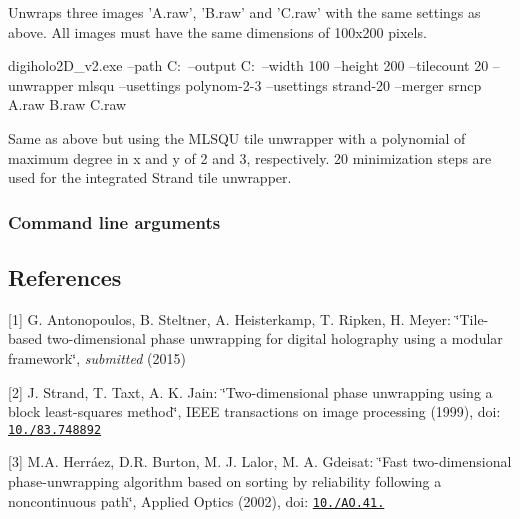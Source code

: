 Unwraps three images 'A.\-raw', 'B.\-raw' and 'C.\-raw' with the same settings as above. All images must have the same dimensions of 100x200 pixels. \begin{DoxyVerb}digiholo2D_v2.exe --path C:\ --output C:\outputfolder\ --width 100 --height 200 --tilecount 20 --unwrapper mlsqu --usettings polynom-2-3 --usettings strand-20 --merger srncp A.raw B.raw C.raw
\end{DoxyVerb}


Same as above but using the M\-L\-S\-Q\-U tile unwrapper with a polynomial of maximum degree in x and y of 2 and 3, respectively. 20 minimization steps are used for the integrated Strand tile unwrapper.

\subsubsection*{Command line arguments}

\subsection*{References}

\mbox{[}1\mbox{]} G. Antonopoulos, B. Steltner, A. Heisterkamp, T. Ripken, H. Meyer\-: \char`\"{}\-Tile-\/based two-\/dimensional phase unwrapping for digital holography using a modular framework\char`\"{}, {\itshape submitted} (2015)

\mbox{[}2\mbox{]} J. Strand, T. Taxt, A. K. Jain\-: \char`\"{}\-Two-\/dimensional phase unwrapping using a block least-\/squares method\char`\"{}, I\-E\-E\-E transactions on image processing (1999), doi\-: \href{http://dx.doi.org/10.1109/83.748892}{\tt 10./83.748892}

\mbox{[}3\mbox{]} M.\-A. Herráez, D.\-R. Burton, M. J. Lalor, M. A. Gdeisat\-: \char`\"{}\-Fast two-\/dimensional phase-\/unwrapping algorithm based on sorting by reliability following a noncontinuous path\char`\"{}, Applied Optics (2002), doi\-: \href{http://dx.doi.org/10.1364/AO.41.007437}{\tt 10./\-A\-O.41.} 
